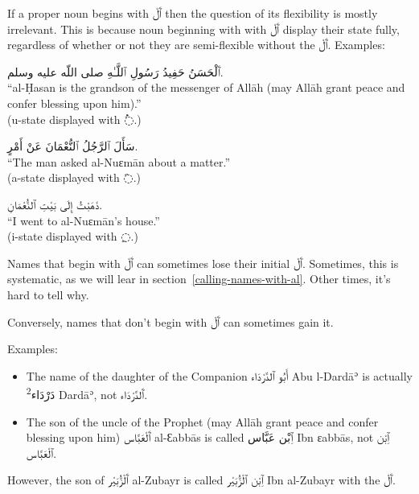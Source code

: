 \documentclass[
  10pt,
]{book}
\begin{document}
If a proper noun begins with \foreignlanguage{arabic}{ٱَلْ} then the question of its flexibility is mostly irrelevant.
This is because noun beginning with with \foreignlanguage{arabic}{ٱَلْ} display their state fully, regardless of whether or not they are semi-flexible without the \foreignlanguage{arabic}{ٱَلْ}. Examples:

\foreignlanguage{arabic}{ٱَلْحَسَنُ حَفِيدُ رَسُولِ ٱللَّـٰهِ صلى اللّه عليه وسلم.}\\
\enquote{al-Ḥasan is the grandson of the messenger of Allāh (may Allāh grant peace and confer blessing upon him).}\\
(u-state displayed with \foreignlanguage{arabic}{◌ُ}.)

\foreignlanguage{arabic}{سَأَلَ ٱلرَّجُلُ ٱلنُّعْمَانَ عَنْ أَمْرٍ.}\\
\enquote{The man asked al-Nuɛmān about a matter.}\\
(a-state displayed with \foreignlanguage{arabic}{◌َ}.)

\foreignlanguage{arabic}{ذَهَبْتُ إِلَى بَيْتِ ٱلنُّعْمَانِ.}\\
\enquote{I went to al-Nuɛmān's house.}\\
(i-state displayed with \foreignlanguage{arabic}{◌ِ}.)

Names that begin with \foreignlanguage{arabic}{ٱَلْ} can sometimes lose their initial \foreignlanguage{arabic}{ٱَلْ}. Sometimes, this is systematic, as we will lear in section~\ref{calling-names-with-al}.
Other times, it's hard to tell why.

Conversely, names that don't begin with \foreignlanguage{arabic}{ٱَلْ} can sometimes gain it.

Examples:

\begin{itemize}
\item
  The name of the daughter of the Companion \foreignlanguage{arabic}{أَبُو ٱلدَّرْدَاء} Abu l-Dardāʾ is actually \textsuperscript{2}\foreignlanguage{arabic}{دَرْدَاء} Dardāʾ, not \foreignlanguage{arabic}{ٱَلدَّرْدَاء}.
\item
  The son of the uncle of the Prophet
  (may Allāh grant peace and confer blessing upon him)
  \foreignlanguage{arabic}{ٱَلْعَبَّاس} al-Ɛabbās
  is called
  \foreignlanguage{arabic}{ٱِبْن عَبَّاس} Ibn ɛabbās, not \foreignlanguage{arabic}{ٱِبْن ٱلْعَبَّاس}.
\end{itemize}

However, the son of
\foreignlanguage{arabic}{ٱَلْزُّبَيْر} al-Zubayr\textbar{}
is called
\foreignlanguage{arabic}{ٱِبْن ٱلْزُّبَيْر} Ibn al-Zubayr with the \foreignlanguage{arabic}{ٱَلْ}.
\end{document}
